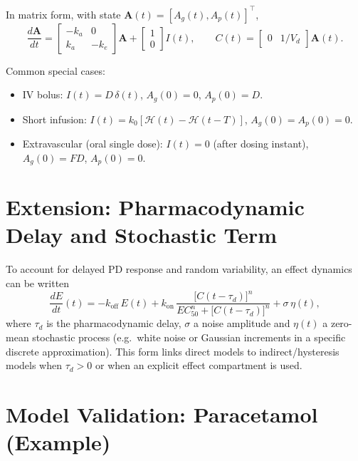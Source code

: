 \documentclass[10pt,a4paper]{article}
\begin{document}
In matrix form, with state $\mathbf{A}(t) = [A_g(t), A_p(t)]^{\top}$,
\begin{equation}
\frac{d\mathbf{A}}{dt} = 
\begin{bmatrix} -k_a & 0 \\ k_a & -k_e \end{bmatrix} \mathbf{A} +
\begin{bmatrix} 1 \\ 0 \end{bmatrix} I(t), \qquad
C(t) = \begin{bmatrix} 0 & 1/V_d \end{bmatrix} \mathbf{A}(t).
\label{eq:statespace}
\end{equation}

Common special cases:
\begin{itemize}
  \item IV bolus: $I(t) = D \, \delta(t)$, $A_g(0) = 0$, $A_p(0) = D$.
  \item Short infusion: $I(t) = k_0 [\mathcal{H}(t) - \mathcal{H}(t-T)]$, $A_g(0) = A_p(0) = 0$.
  \item Extravascular (oral single dose): $I(t) = 0$ (after dosing instant), $A_g(0) = F D$, $A_p(0) = 0$.
\end{itemize}

\section{Extension: Pharmacodynamic Delay and Stochastic Term}

To account for delayed PD response and random variability, an effect dynamics can be written
\begin{equation}
\frac{dE}{dt}(t) = -k_{\mathrm{off}} \, E(t) + k_{\mathrm{on}} \, \frac{\bigl[C(t-\tau_d)\bigr]^n}{EC_{50}^n + \bigl[C(t-\tau_d)\bigr]^n} + \sigma \, \eta(t),
\label{eq:stochastic}
\end{equation}
where $\tau_d$ is the pharmacodynamic delay, $\sigma$ a noise amplitude and $\eta(t)$ a zero-mean stochastic process (e.g.\ white noise or Gaussian increments in a specific discrete approximation). This form links direct models to indirect/hysteresis models when $\tau_d > 0$ or when an explicit effect compartment is used.

\section{Model Validation: Paracetamol (Example)}
\end{document}
